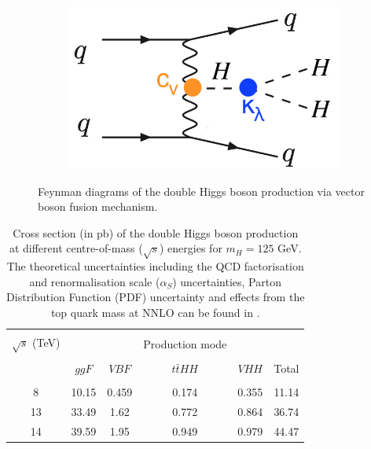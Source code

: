 \begin{figure}[ht]
\begin{subfigure}[b]{0.35\textwidth}
            \centering 
            \includegraphics[width=\textwidth]{MSc_Thesis/fig/vbf3.png}
            \vspace{-0.5cm}
            \firstsubcaption{$\kappa_\lambda$}
            \label{vbfHH3}
        \end{subfigure}
        \caption[]
        {\small Feynman diagrams of the double Higgs boson production via vector boson fusion mechanism.}
\end{figure}

\begin{table}[ht]
	{\setlength{\tabcolsep}{14pt}
		\caption[Cross section (in pb) of the double Higgs boson production at different centre-of-mass ($\sqrt{s}$) energies for $m_H=125$ GeV. The theoretical uncertainties including the QCD factorisation and renormalisation scale ($\alpha_S$) uncertainties, Parton Distribution Function (PDF) uncertainty and effects from the top quark mass at NNLO can be found in the reference.]{Cross section (in pb) of the double Higgs boson production at different centre-of-mass ($\sqrt{s}$) energies for $m_H=125$ GeV. The theoretical uncertainties including the QCD factorisation and renormalisation scale ($\alpha_S$) uncertainties, Parton Distribution Function (PDF) uncertainty and effects from the top quark mass at NNLO can be found in \cite{higgs-br-vs-mH}.}
		\begin{center}
			\vspace{-6mm}
			\begin{tabular}{cccccc}
				\hline \\[-2.45ex] \hline \\[-2.1ex]
				$\sqrt{s}$ (TeV) &&&Production mode&&\\
				\hline \\[-1.8ex]
				& $ggF$ & $VBF$ & $t\bar tHH$ & $VHH$ & Total \\
				\hline \\[-1.8ex]
                8 & 10.15 & 0.459 & 0.174 & 0.355 & 11.14 \\
                13 & 33.49 & 1.62 & 0.772 & 0.864 & 36.74 \\
                14 & 39.59 & 1.95 & 0.949 & 0.979 & 44.47 \\
				\hline
			\end{tabular}
			\vspace{-6mm}
		\end{center}
		\label{HHxsecTable}}
\end{table}


